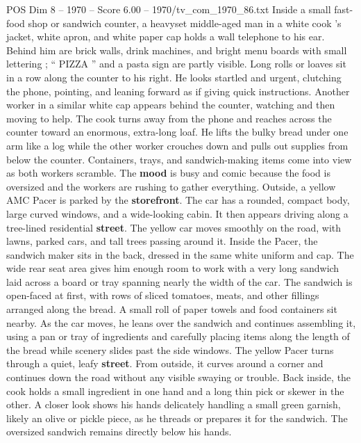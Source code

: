 \begin{textsample}{POS Dim 8 – 1970 – Score 6.00 – 1970/tv\_com\_1970\_86.txt}  \label{ex:f8_pos_038}
Inside a small fast-food shop or sandwich counter, a heavyset middle-aged man in a white cook ’s jacket, white apron, and white paper cap holds a wall telephone to his ear.
Behind him are brick walls, drink machines, and bright menu boards with small lettering ; “ PIZZA ” and a pasta sign are partly visible.
Long rolls or loaves sit in a row along the counter to his right.
He looks startled and urgent, clutching the phone, pointing, and leaning forward as if giving quick instructions.
Another worker in a similar white cap appears behind the counter, watching and then moving to help.
The cook turns away from the phone and reaches across the counter toward an enormous, extra-long loaf.
He lifts the bulky bread under one arm like a log while the other worker crouches down and pulls out supplies from below the counter.
Containers, trays, and sandwich-making items come into view as both workers scramble.
The \textbf{mood} is busy and comic because the food is oversized and the workers are rushing to gather everything.
Outside, a yellow AMC Pacer is parked by the \textbf{storefront}.
The car has a rounded, compact body, large curved windows, and a wide-looking cabin.
It then appears driving along a tree-lined residential \textbf{street}.
The yellow car moves smoothly on the road, with lawns, parked cars, and tall trees passing around it.
Inside the Pacer, the sandwich maker sits in the back, dressed in the same white uniform and cap.
The wide rear seat area gives him enough room to work with a very long sandwich laid across a board or tray spanning nearly the width of the car.
The sandwich is open-faced at first, with rows of sliced tomatoes, meats, and other fillings arranged along the bread.
A small roll of paper towels and food containers sit nearby.
As the car moves, he leans over the sandwich and continues assembling it, using a pan or tray of ingredients and carefully placing items along the length of the bread while scenery slides past the side windows.
The yellow Pacer turns through a quiet, leafy \textbf{street}.
From outside, it curves around a corner and continues down the road without any visible swaying or trouble.
Back inside, the cook holds a small ingredient in one hand and a long thin pick or skewer in the other.
A closer look shows his hands delicately handling a small green garnish, likely an olive or pickle piece, as he threads or prepares it for the sandwich.
The oversized sandwich remains directly below his hands.

\end{textsample}
